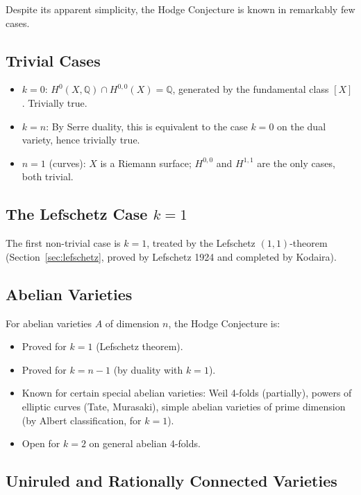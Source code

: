 \documentclass[12pt,a4paper]{amsart}
\theoremstyle{definition}
\theoremstyle{remark}
\begin{document}
Despite its apparent simplicity, the Hodge Conjecture is known in remarkably few cases.

\subsection{Trivial Cases}

\begin{itemize}
\item $k = 0$: $H^0(X,\mathbb{Q}) \cap H^{0,0}(X) = \mathbb{Q}$, generated by the
  fundamental class $[X]$. Trivially true.
\item $k = n$: By Serre duality, this is equivalent to the case $k = 0$ on the
  dual variety, hence trivially true.
\item $n = 1$ (curves): $X$ is a Riemann surface; $H^{0,0}$ and $H^{1,1}$ are
  the only cases, both trivial.
\end{itemize}

\subsection{The Lefschetz Case \texorpdfstring{$k=1$}{k=1}}

The first non-trivial case is $k = 1$, treated by the Lefschetz $(1,1)$-theorem
(Section~\ref{sec:lefschetz}, proved by Lefschetz 1924 and completed by Kodaira).

\subsection{Abelian Varieties}

For abelian varieties $A$ of dimension $n$, the Hodge Conjecture is:
\begin{itemize}
\item Proved for $k = 1$ (Lefschetz theorem).
\item Proved for $k = n-1$ (by duality with $k = 1$).
\item Known for certain special abelian varieties: Weil 4-folds (partially),
  powers of elliptic curves (Tate, Murasaki), simple abelian varieties of
  prime dimension (by Albert classification, for $k=1$).
\item Open for $k = 2$ on general abelian 4-folds.
\end{itemize}

\subsection{Uniruled and Rationally Connected Varieties}
\end{document}
